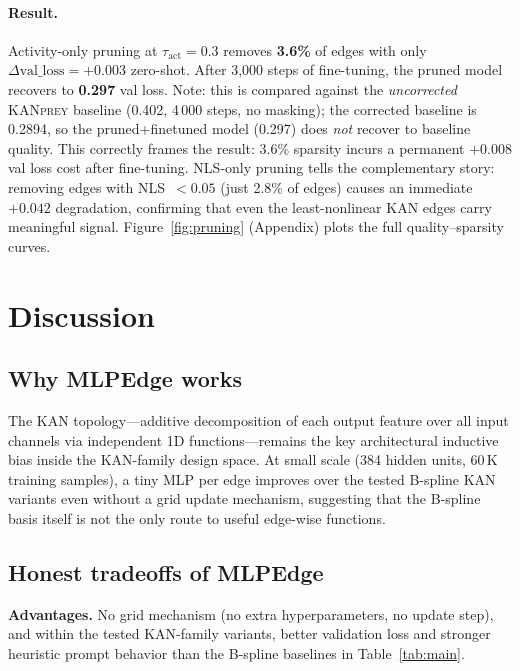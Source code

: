 \documentclass{article}
\newcommand{\kanprey}{\textsc{KANprey}}
\begin{document}
\paragraph{Result.}
Activity-only pruning at $\tau_\text{act}=0.3$ removes \textbf{3.6\%} of edges
with only $\Delta\text{val\_loss} = +0.003$ zero-shot.
After 3{,}000 steps of fine-tuning, the pruned model recovers to
\textbf{0.297} val loss.
Note: this is compared against the \emph{uncorrected} \kanprey{} baseline
(0.402, 4\,000 steps, no masking); the corrected baseline is 0.2894, so the
pruned+finetuned model (0.297) does \emph{not} recover to baseline quality.
This correctly frames the result: 3.6\% sparsity incurs a permanent
$+0.008$ val loss cost after fine-tuning.
NLS-only pruning tells the complementary story: removing edges with
NLS~$<0.05$ (just 2.8\% of edges) causes an immediate $+0.042$ degradation,
confirming that even the least-nonlinear KAN edges carry meaningful signal.
Figure~\ref{fig:pruning} (Appendix) plots the full quality--sparsity curves.

\section{Discussion}
\label{sec:discussion}

\subsection{Why MLPEdge works}

The KAN topology---additive decomposition of each output feature over all
input channels via independent 1D functions---remains the key architectural
inductive bias inside the KAN-family design space.
At small scale (384 hidden units, 60\,K training samples), a tiny MLP per
edge improves over the tested B-spline KAN variants even without a grid update
mechanism, suggesting that the B-spline basis itself is not the only route to
useful edge-wise functions.

\subsection{Honest tradeoffs of MLPEdge}

\textbf{Advantages.}
No grid mechanism (no extra hyperparameters, no update step), and within the
tested KAN-family variants, better validation loss and stronger heuristic
prompt behavior than the B-spline baselines in Table~\ref{tab:main}.
\end{document}
